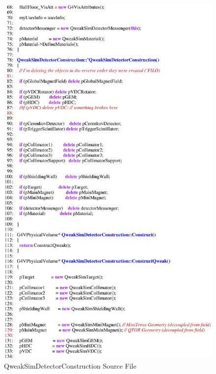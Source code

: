 \begin{figure}[ht]
  \hspace{0cm}
  \includegraphics[scale=0.8]{./figures4/QweakSimDetectorConstruction.cc-p2.eps}
  \caption{QweakSimDetectorConstruction Source File}
           \label{fig:V-SC-6}
\end{figure}
\clearpage


